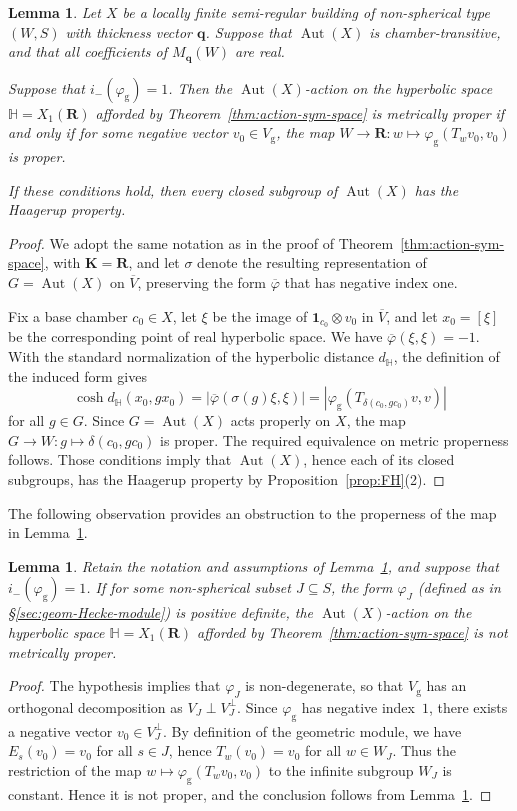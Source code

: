 \documentclass[12pt,a4paper]{amsproc}
\newtheorem{lemma}[theorem]{Lemma}
\theoremstyle{definition}
\DeclareMathOperator{\Aut}{Aut}
\newcommand{\KK}{\mathbf K}
\newcommand{\RR}{\mathbf R}
\newcommand{\one}{\mathbf 1}
\newcommand{\qq}{\mathbf q}
\newcommand{\rg}{\mathrm g}
\begin{document}
\begin{lemma}\label{lem:char-proper}
Let $X$ be a locally finite semi-regular building of non-spherical type $(W, S)$ with thickness vector $\qq$.  Suppose that $\Aut(X)$ is chamber-transitive,  and that all coefficients of $M_\qq(W)$ are real.  

Suppose that $i_-(\varphi_\rg)=1$. Then the $\Aut(X)$-action on the hyperbolic space $\mathbb H  = X_1(\RR)$ afforded by Theorem~\ref{thm:action-sym-space} is metrically proper if and only if for some negative vector $v_0 \in V_\rg$, the map $W \to \RR : w \mapsto \varphi_\rg(T_w v_0, v_0)$ is  proper. 

If these conditions hold, then every  closed subgroup of $\Aut(X)$ has the Haagerup property. 
\end{lemma}
\begin{proof}
We adopt the same notation as in the proof of  Theorem~\ref{thm:action-sym-space}, with   $\KK  =\RR$, and let $\sigma$ denote the resulting representation of $G = \Aut(X)$ on $\overline V$, preserving the  form $\overline\varphi$ that has negative index one.

Fix a base chamber $c_0\in X$, let $\xi$ be the image of $\one_{c_0}\otimes v_0$ in $\overline V$, and let $x_0=[\xi]$
be the corresponding point of real hyperbolic space. We have $\overline\varphi(\xi,\xi)=-1$. With the standard normalization of the hyperbolic distance $d_{\mathbb H}$, the definition of the induced form gives
$$
\cosh d_{\mathbb H}(x_0,gx_0)
=|\overline\varphi(\sigma(g)\xi,\xi)|=|\varphi_\rg(T_{\delta(c_0,gc_0)}v,v)|
$$
for all $g \in G$. 
Since $G=\Aut(X)$ acts properly on $X$, the map $G \to W : g \mapsto \delta(c_0,gc_0)$ is proper. The required equivalence    on metric properness follows. Those conditions imply that $\Aut(X)$, hence each of its   closed subgroups, has the Haagerup property by Proposition~\ref{prop:FH}(2).
\end{proof}

The following observation provides an obstruction to the properness of the map in Lemma~\ref{lem:char-proper}. 

\begin{lemma}\label{lem:non-proper}
Retain the notation and assumptions of Lemma~\ref{lem:char-proper}, and suppose that $i_-(\varphi_\rg)=1$.  If for some non-spherical subset $J \subseteq S$, the form $\varphi_J$ (defined as in \S\ref{sec:geom-Hecke-module}) is positive definite,   the $\Aut(X)$-action on the hyperbolic space $\mathbb H  = X_1(\RR)$ afforded by Theorem~\ref{thm:action-sym-space} is not metrically proper. 
\end{lemma}
\begin{proof}
The hypothesis implies that $\varphi_J$ is non-degenerate, so that $V_\rg$ has an orthogonal decomposition as $V_J \perp V_J^\perp$. Since $\varphi_\rg$ has negative index~$1$, there exists a negative vector $v_0 \in V_J^\perp$. By definition of the geometric module, we have $E_s(v_0) = v_0$ for all $s \in J$, hence $T_w(v_0) = v_0$ for all $w \in W_J$. Thus the restriction of the map $w \mapsto \varphi_\rg(T_w v_0, v_0)$ to the infinite subgroup $W_J$ is constant. Hence it is not proper, and the conclusion follows from Lemma~\ref{lem:char-proper}.
\end{proof}
\end{document}

